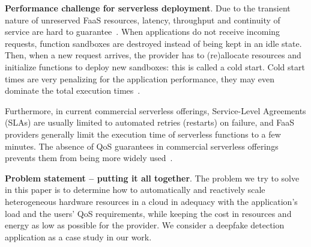 

\textbf{Performance challenge for serverless deployment}. Due to the transient nature of unreserved FaaS resources, latency, throughput and continuity of service are hard to guarantee~\cite{vaneykSPECRGCloud2018, dartoisCuckooOpportunisticMapReduce2019}. When applications do not receive incoming requests, function sandboxes are destroyed instead of being kept in an idle state. Then, when a new request arrives, the provider has to (re)allocate resources and initialize functions to deploy new sandboxes: this is called a cold start. Cold start times are very penalizing for the application performance, they may even dominate the total execution times~\cite{mullerLambadaInteractiveData2020}.

Furthermore, in current commercial serverless offerings, Service-Level Agreements (SLAs) are usually limited to automated retries (restarts) on failure, and FaaS providers generally limit the execution time of serverless functions to a few minutes. The absence of QoS guarantees in commercial serverless offerings prevents them from being more widely used~\cite{buyyaSLAorientedResourceProvisioning2011}.


\textbf{Problem statement -- putting it all together}. The problem we try to solve in this paper is to determine how to automatically and reactively scale heterogeneous hardware resources in a cloud in adequacy with the application's load and the users' QoS requirements, while keeping the cost in resources and energy as low as possible for the provider. We consider a deepfake detection application as a case study in our work.

